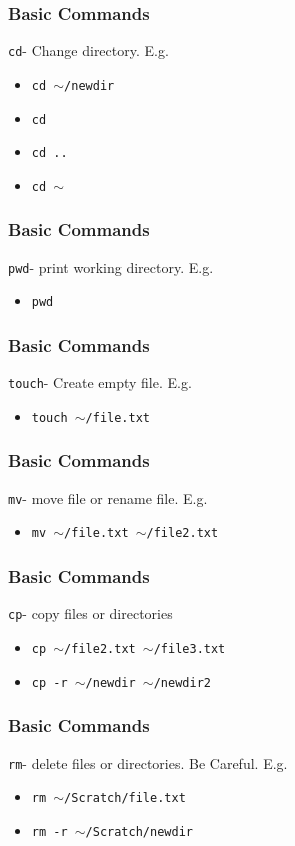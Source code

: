 \documentclass{beamer}
\newcommand{\code}[1]{\colorbox{codegray}{\texttt{#1}}}
\begin{document}
\begin{frame}
\frametitle{Basic Commands}
\code{cd}- Change directory. E.g.
\bigskip
\begin{itemize}
    \item \code{cd $\sim$/newdir}
    \pause
    \bigskip
    \item \code{cd}
    \pause
    \bigskip
    \item \code{cd ..}
    \pause
    \bigskip
    \item \code{cd $\sim$} 
\end{itemize}
\end{frame}


\begin{frame}
\frametitle{Basic Commands}
\code{pwd}- print working directory. E.g.
\bigskip
\begin{itemize}
    \item \code{pwd}
\end{itemize}
\end{frame}


\begin{frame}
\frametitle{Basic Commands}
\code{touch}- Create empty file. E.g.
\bigskip
\begin{itemize}
    \item \code{touch $\sim$/file.txt}
\end{itemize}
\end{frame}


\begin{frame}
\frametitle{Basic Commands}
\code{mv}- move file or rename file. E.g.
\bigskip
\begin{itemize}
    \item \code{mv $\sim$/file.txt $\sim$/file2.txt}
\end{itemize}
\end{frame}

\begin{frame}
\frametitle{Basic Commands}
\code{cp}- copy files or directories
\bigskip
\begin{itemize}
    \item \code{cp $\sim$/file2.txt $\sim$/file3.txt}
    \pause
    \bigskip
    \item \code{cp -r $\sim$/newdir $\sim$/newdir2}
\end{itemize}
\end{frame}


\begin{frame}
\frametitle{Basic Commands}
\code{rm}- delete files or directories. Be Careful. E.g.
\bigskip
\begin{itemize}
    \item \code{rm $\sim$/Scratch/file.txt}
    \pause
    \bigskip
    \item \code{rm -r $\sim$/Scratch/newdir}
\end{itemize}
\end{frame}
\end{document}
